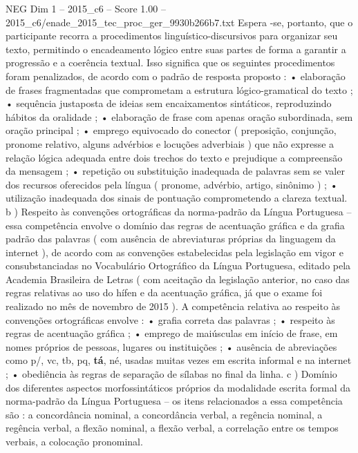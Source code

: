 \begin{textsample}{NEG Dim 1 – 2015\_c6 – Score 1.00 – 2015\_c6/enade\_2015\_tec\_proc\_ger\_9930b266b7.txt}
Espera -se, portanto, que o participante recorra a procedimentos linguístico-discursivos para organizar seu texto, permitindo o encadeamento lógico entre suas partes de forma a garantir a progressão e a coerência textual.
Isso significa que os seguintes procedimentos foram penalizados, de acordo com o padrão de resposta proposto : • elaboração de frases fragmentadas que comprometam a estrutura lógico-gramatical do texto ; • sequência justaposta de ideias sem encaixamentos sintáticos, reproduzindo hábitos da oralidade ; • elaboração de frase com apenas oração subordinada, sem oração principal ; • emprego equivocado do conector ( preposição, conjunção, pronome relativo, alguns advérbios e locuções adverbiais ) que não expresse a relação lógica adequada entre dois trechos do texto e prejudique a compreensão da mensagem ; • repetição ou substituição inadequada de palavras sem se valer dos recursos oferecidos pela língua ( pronome, advérbio, artigo, sinônimo ) ; • utilização inadequada dos sinais de pontuação comprometendo a clareza textual. b ) Respeito às convenções ortográficas da norma-padrão da Língua Portuguesa – essa competência envolve o domínio das regras de acentuação gráfica e da grafia padrão das palavras ( com ausência de abreviaturas próprias da linguagem da internet ), de acordo com as convenções estabelecidas pela legislação em vigor e consubstanciadas no Vocabulário Ortográfico da Língua Portuguesa, editado pela Academia Brasileira de Letras ( com aceitação da legislação anterior, no caso das regras relativas ao uso do hífen e da acentuação gráfica, já que o exame foi realizado no mês de novembro de 2015 ).
A competência relativa ao respeito às convenções ortográficas envolve : • grafia correta das palavras ; • respeito às regras de acentuação gráfica ; • emprego de maiúsculas em início de frase, em nomes próprios de pessoas, lugares ou instituições ; • ausência de abreviações como p/, vc, tb, pq, \textbf{tá}, né, usadas muitas vezes em escrita informal e na internet ; • obediência às regras de separação de sílabas no final da linha. c ) Domínio dos diferentes aspectos morfossintáticos próprios da modalidade escrita formal da norma-padrão da Língua Portuguesa – os itens relacionados a essa competência são : a concordância nominal, a concordância verbal, a regência nominal, a regência verbal, a flexão nominal, a flexão verbal, a correlação entre os tempos verbais, a colocação pronominal.

\end{textsample}
